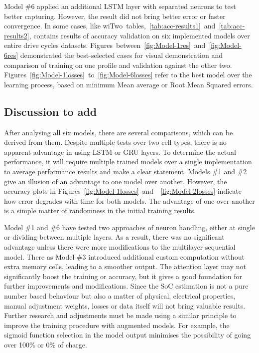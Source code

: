 %
%
Model \#6 applied an additional LSTM layer with separated neurons to test better capturing.
However, the result did not bring better error or faster convergence.
In some cases, like wi\mbox{Two tables, \ref{tab:acc-results1} and \ref{tab:acc-results2}}, contains results of accuracy validation on six implemented models over entire drive cycles datasets.
\mbox{Figures between \ref{fig:Model-1res} and \ref{fig:Model-6res}} demonstrated the best-selected cases for visual demonstration and comparison of training on one profile and validation against the other two.
\mbox{Figures \ref{fig:Model-1losses} to \ref{fig:Model-6losses}} refer to the best model over the learning process, based on minimum Mean average or Root Mean Squared errors.

%
%
\subsection{Discussion to add}
After analysing all six models, there are several comparisons, which can be derived from them.
Despite multiple tests over two cell types, there is no apparent advantage in using LSTM or GRU layers.
To determine the actual performance, it will require multiple trained models over a single implementation to average performance results and make a clear statement.
Models \#1 and \#2 give an illusion of an advantage to one model over another.
However, the accuracy plots in \mbox{Figures~\ref{fig:Model-1losses} and ~\ref{fig:Model-2losses}} indicate how error degrades with time for both models.
The advantage of one over another is a simple matter of randomness in the initial training results.

%
%
Model \#1 and \#6 have tested two approaches of neuron handling, either at single or dividing between multiple layers.
As a result, there was no significant advantage unless there were more modifications to the multilayer sequential model.
There as Model \#3 introduced additional custom computation without extra memory cells, leading to a smoother output.
The attention layer may not significantly boost the training or accuracy, but it gives a good foundation for further improvements and modifications.
Since the SoC estimation is not a pure number based behaviour but also a matter of physical, electrical properties, manual adjustment weights, losses or data itself will not bring valuable results.
Further research and adjustments must be made using a similar principle to improve the training procedure with augmented models. 
For example, the sigmoid function selection in the model output minimises the possibility of going over 100\% or 0\% of charge.

